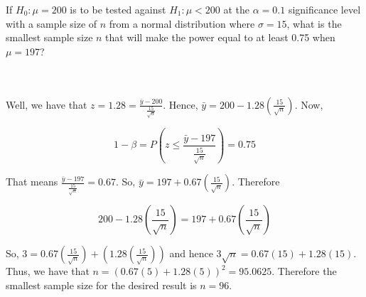 If $H_0:\mu=200$ is to be tested against $H_1:\mu<200$ at the $\alpha=0.1$ significance level with a
sample size of $n$ from a normal distribution where $\sigma=15$, what is the smallest sample size $n$
that will make the power equal to at least 0.75 when $\mu=197$?\\\\

\begin{solution}\renewcommand{\qedsymbol}{}\ \\
    Well, we have that $z=1.28=\frac{\bar{y}-200}{\frac{15}{\sqrt{n}}}$. Hence,
    $\bar{y}=200-1.28(\frac{15}{\sqrt{n}})$. Now,
    
    $$1-\beta=P(z\leq\frac{\bar{y}-197}{\frac{15}{\sqrt{n}}})=0.75$$
    
    That means $\frac{\bar{y}-197}{\frac{15}{\sqrt{n}}}=0.67$. So,
    $\bar{y}=197+0.67(\frac{15}{\sqrt{n}})$. Therefore
    
    $$200-1.28(\frac{15}{\sqrt{n}})=197+0.67(\frac{15}{\sqrt{n}})$$
    
    So, $3=0.67(\frac{15}{\sqrt{n}})+(1.28(\frac{15}{\sqrt{n}}))$ and hence
    $3\sqrt{n}=0.67(15)+1.28(15)$. Thus, we have that $n=(0.67(5)+1.28(5))^2=95.0625$. Therefore the
    smallest sample size for the desired result is $n=96$.

\end{solution}